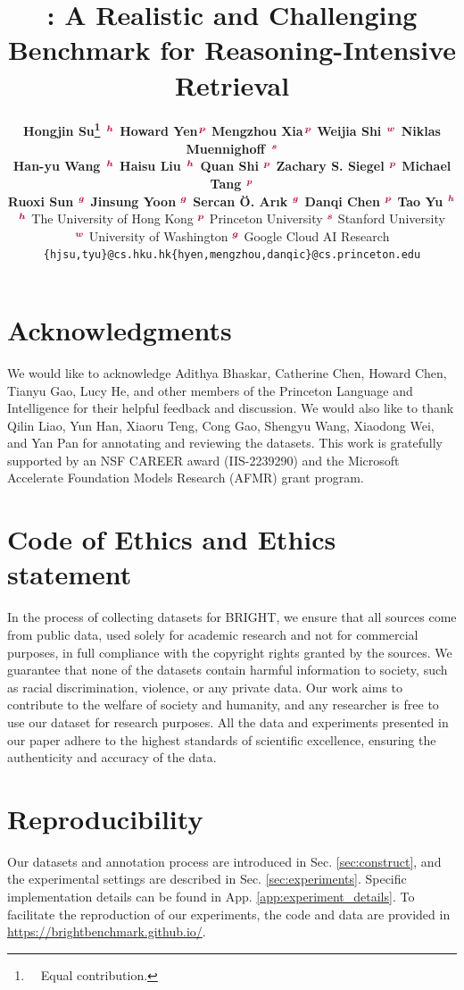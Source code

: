 \documentclass{article} %
\title{\ours: A Realistic and Challenging Benchmark for Reasoning-Intensive Retrieval}
\author{
  {\bf
    Hongjin Su\thanks{\ \ Equal contribution.} 
    $^{\hspace{.1em}{\color{purple}\boldsymbol{h}}}$
    \quad 
    Howard Yen\footnotemark[1]
    $^{\hspace{.1em}{\color{purple}\boldsymbol{p}}}$
    \quad
    Mengzhou Xia\footnotemark[1]
    $^{\hspace{.1em}{\color{purple}\boldsymbol{p}}}$
    \quad
    Weijia Shi
    $^{{\color{purple}\boldsymbol{w}}}$
    \quad
    Niklas Muennighoff
    $^{\hspace{.1em}{\color{purple}\boldsymbol{s}}}$
    \vspace{4pt}
  } \\
  {
  \bf
    Han-yu Wang
    $^{\hspace{.1em}{\color{purple}\boldsymbol{h}}}$
    \enskip
    Haisu Liu
    $^{\hspace{.1em}{\color{purple}\boldsymbol{h}}}$
    \enskip
    Quan Shi
    $^{{\color{purple}\boldsymbol{p}}}$
    \enskip
    Zachary S. Siegel
    $^{{\color{purple}\boldsymbol{p}}}$
    \enskip
    Michael Tang
    $^{{\color{purple}\boldsymbol{p}}}$
    \vspace{4pt}
  } \\
  {
  \bf
    Ruoxi Sun
    $^{{\color{purple}\boldsymbol{g}}}$
    \vspace{1pt}
    Jinsung Yoon
    $^{{\color{purple}\boldsymbol{g}}}$
    \vspace{1pt}
    Sercan \"{O}. Ar{\i}k
    $^{{\color{purple}\boldsymbol{g}}}$
    \vspace{1pt}
    Danqi Chen
    $^{{\color{purple}\boldsymbol{p}}}$
    \vspace{1pt}
    Tao Yu
    $^{{\color{purple}\boldsymbol{h}}}$
    \vspace{1pt}
  } \\
  {
    $^{\color{purple}\boldsymbol{h}}$ The University of Hong Kong \quad
    $^{\color{purple}\boldsymbol{p}}$ Princeton University \quad 
    $^{\color{purple}\boldsymbol{s}}$ Stanford University \quad 
  }
    \\
  {
    $^{\color{purple}\boldsymbol{w}}$ University of Washington \quad
    $^{\color{purple}\boldsymbol{g}}$ Google Cloud AI Research \quad
    \vspace{4pt}
  } \\
  \texttt{\{hjsu,tyu\}@cs.hku.hk}\hspace{15pt}\texttt{\{hyen,mengzhou,danqic\}@cs.princeton.edu}\hspace{15pt} \\
}
\begin{document}
\maketitle










\clearpage


\section*{Acknowledgments}

We would like to acknowledge Adithya Bhaskar, Catherine Chen, Howard Chen, Tianyu Gao, Lucy He, and other members of the Princeton Language and Intelligence for their helpful feedback and discussion. 
We would also like to thank Qilin Liao, Yun Han, Xiaoru Teng, Cong Gao, Shengyu Wang, Xiaodong Wei, and Yan Pan
for annotating and reviewing the datasets.
This work is gratefully supported by an NSF CAREER award (IIS-2239290) and the Microsoft Accelerate Foundation Models Research (AFMR) grant program.

\section*{Code of Ethics and Ethics statement}

In the process of collecting datasets for BRIGHT, we ensure that all sources come from public data, used solely for academic research and not for commercial purposes, in full compliance with the copyright rights granted by the sources. We guarantee that none of the datasets contain harmful information to society, such as racial discrimination, violence, or any private data. Our work aims to contribute to the welfare of society and humanity, and any researcher is free to use our dataset for research purposes. All the data and experiments presented in our paper adhere to the highest standards of scientific excellence, ensuring the authenticity and accuracy of the data.



\section*{Reproducibility}

Our datasets and annotation process are introduced in Sec. \ref{sec:construct}, and the experimental settings are described in Sec. \ref{sec:experiments}. Specific implementation details can be found in App. \ref{app:experiment_details}. To facilitate the reproduction of our experiments, the code and data are provided in \url{https://brightbenchmark.github.io/}.





\appendix

\end{document}
